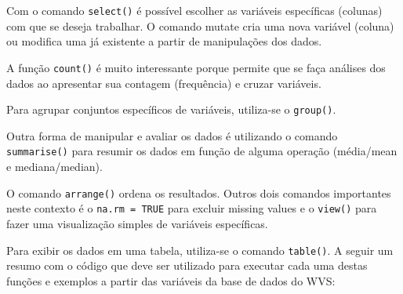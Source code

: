 \documentclass[
  brazil,
]{book}
\newenvironment{Shaded}{\begin{snugshade}}{\end{snugshade}}
\newcommand{\CommentTok}[1]{\textcolor[rgb]{0.56,0.35,0.01}{\textit{#1}}}
\newcommand{\DataTypeTok}[1]{\textcolor[rgb]{0.13,0.29,0.53}{#1}}
\newcommand{\DecValTok}[1]{\textcolor[rgb]{0.00,0.00,0.81}{#1}}
\newcommand{\KeywordTok}[1]{\textcolor[rgb]{0.13,0.29,0.53}{\textbf{#1}}}
\newcommand{\NormalTok}[1]{#1}
\newcommand{\OperatorTok}[1]{\textcolor[rgb]{0.81,0.36,0.00}{\textbf{#1}}}
\newcommand{\StringTok}[1]{\textcolor[rgb]{0.31,0.60,0.02}{#1}}
\begin{document}
Com o comando \texttt{select()} é possível escolher as variáveis específicas (colunas) com que se deseja trabalhar. O comando mutate cria uma nova variável (coluna) ou modifica uma já existente a partir de manipulações dos dados.

A função \texttt{count()} é muito interessante porque permite que se faça análises dos dados ao apresentar sua contagem (frequência) e cruzar variáveis.

Para agrupar conjuntos específicos de variáveis, utiliza-se o \texttt{group()}.

Outra forma de manipular e avaliar os dados é utilizando o comando \texttt{summarise()} para resumir os dados em função de alguma operação (média/mean e mediana/median).

O comando \texttt{arrange()} ordena os resultados. Outros dois comandos importantes neste contexto é o \texttt{na.rm\ =\ TRUE} para excluir missing values e o \texttt{view()} para fazer uma visualização simples de variáveis específicas.

Para exibir os dados em uma tabela, utiliza-se o comando \texttt{table()}. A seguir um resumo com o código que deve ser utilizado para executar cada uma destas funções e exemplos a partir das variáveis da base de dados do WVS:

\begin{Shaded}
\end{Shaded}
\end{document}
